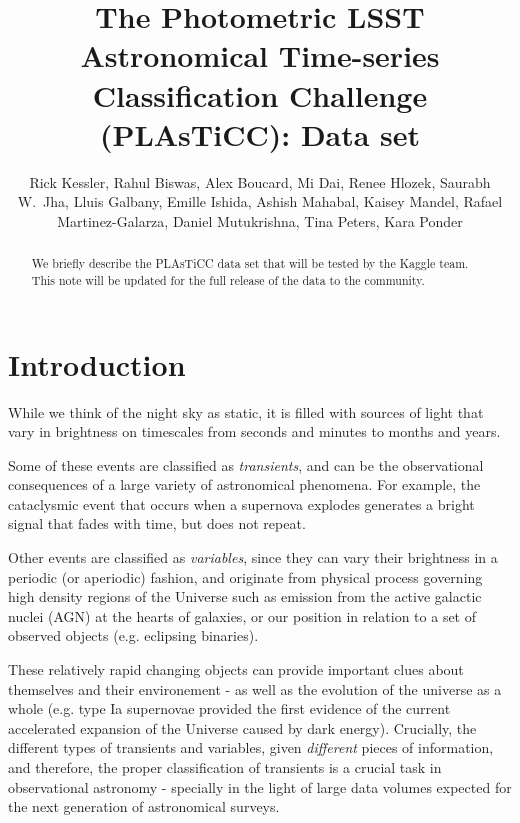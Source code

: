 \documentclass[\docopts]{\docclass}
\author{Rick Kessler,  Rahul Biswas, Alex Boucard, Mi Dai, Renee Hlozek,
Saurabh W.~Jha, Lluis Galbany, Emille Ishida, Ashish Mahabal, Kaisey Mandel, Rafael Martinez-Galarza, Daniel Mutukrishna, Tina Peters, Kara Ponder}
\begin{document}
\title{The Photometric LSST Astronomical Time-series Classification Challenge (PLAsTiCC): Data set}

\maketitlepre

\begin{abstract}
We briefly describe the PLAsTiCC data set that will be tested by the Kaggle team. This note will be updated for the full release of the data to the community.

\end{abstract}

\dockeys{}

\maketitlepost


\section{Introduction}
\label{sec:intro}
While we think of the night sky as static, it is filled with sources of light that vary in brightness on timescales from seconds and minutes to months and years. 

Some of these events are classified as \textit{transients}, and can be the
observational consequences of a large variety of astronomical phenomena. For example, the cataclysmic event that occurs when a supernova explodes generates a bright signal that fades with time, but does not repeat.

Other events are classified as \textit{variables}, since they can vary their brightness in a periodic (or aperiodic) fashion, and originate from physical process governing high density regions of the Universe such as emission from the active galactic nuclei (AGN) at the hearts of galaxies, or our position in relation to a set of observed objects (e.g. eclipsing binaries).

These relatively rapid changing objects can provide important clues about themselves and their environement - as well as the evolution of the universe as a whole (e.g. type Ia supernovae provided the first evidence of the current accelerated expansion of the Universe caused by dark energy). Crucially, the different types of transients and variables, given \textit{different} pieces of information, and therefore, the proper classification of transients is a crucial task in observational astronomy - specially in the light of large data volumes expected for the next generation of astronomical surveys.
\end{document}
